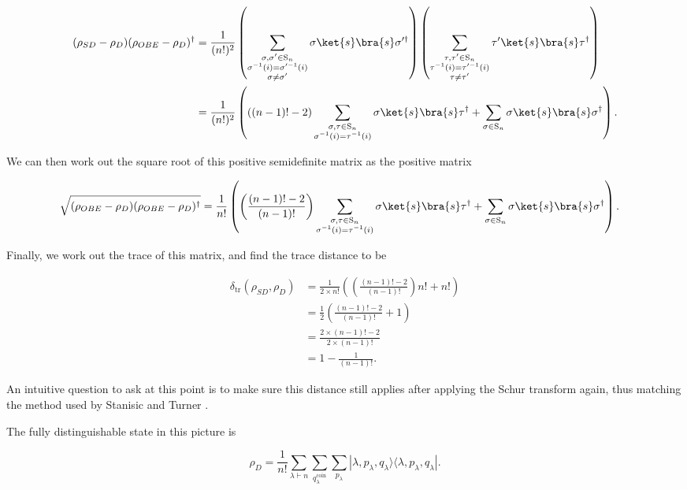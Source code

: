 \begin{align}
(\rho_{SD} - \rho_D)(\rho_{OBE} - \rho_D)^\dagger &= \frac{1}{(n!)^2}\left(\sum_{\substack{\sigma,\sigma'\in\textrm{S}_n\\\sigma^{-1}(i)=\sigma'^{-1}(i)\\\sigma\neq\sigma'}}\sigma\ket{s}\bra{s}\sigma'^\dagger\right)\left(\sum_{\substack{\tau,\tau'\in\textrm{S}_n\\\tau^{-1}(i)=\tau'^{-1}(i)\\\tau\neq\tau'}}\tau'\ket{s}\bra{s}\tau^\dagger\right)\\
&= \frac{1}{(n!)^2}\left(((n-1)! - 2)\sum_{\substack{\sigma,\tau\in\textrm{S}_n\\\sigma^{-1}(i)=\tau^{-1}(i)}}\sigma\ket{s}\bra{s}\tau^\dagger + \sum_{\sigma \in \textrm{S}_n}\sigma\ket{s}\bra{s}\sigma^\dagger\right).
\end{align}

We can then work out the square root of this positive semidefinite matrix as the positive matrix

\begin{align}
\sqrt{(\rho_{OBE} - \rho_D)(\rho_{OBE} - \rho_D)^\dagger} &= \frac{1}{n!}\left(\left(\frac{(n-1)!-2}{(n-1)!}\right)\sum_{\substack{\sigma,\tau\in\textrm{S}_n\\\sigma^{-1}(i)=\tau^{-1}(i)}}\sigma\ket{s}\bra{s}\tau^\dagger + \sum_{\sigma \in \textrm{S}_n}\sigma\ket{s}\bra{s}\sigma^\dagger\right).
\end{align}

Finally, we work out the trace of this matrix, and find the trace distance to be

\begin{align}
\delta_{\mathrm{tr}}(\rho_{SD}, \rho_D) &= \frac{1}{2\times n!}\left(\left(\frac{(n-1)!-2}{(n-1)!}\right)n! + n!\right)\\
&= \frac{1}{2}\left(\frac{(n-1)!-2}{(n-1)!} + 1\right)\\
&= \frac{2 \times (n-1)! - 2}{2 \times (n-1)!}\\
&= 1 - \frac{1}{(n-1)!}.
\end{align}

An intuitive question to ask at this point is to make sure this distance still applies after applying the Schur transform again, thus matching the method used by Stanisic and Turner \cite{stanisic2018}.

The fully distinguishable state in this picture is

\begin{equation}
\rho_D = \frac{1}{n!} \sum_{\lambda \vdash n} \sum_{q_\lambda^\mathrm{coin}} \sum_{p_\lambda} |\lambda,p_\lambda,q_\lambda\rangle\langle \lambda,p_\lambda,q_\lambda|.
\end{equation}


